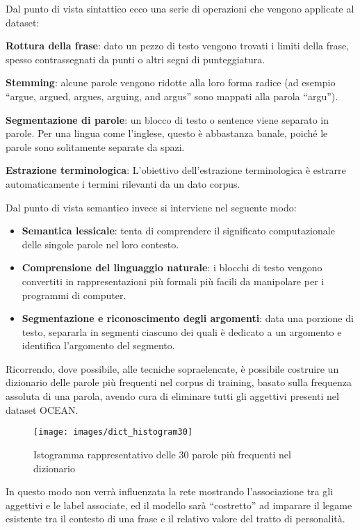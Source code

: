 Dal punto di vista sintattico ecco una serie di operazioni che vengono applicate al dataset:
\begin{itemize}
	\item \textbf{Rottura della frase}: dato un pezzo di testo vengono trovati i limiti della frase, spesso contrassegnati da punti o altri segni di punteggiatura.
	\item \textbf{Stemming}: alcune parole vengono ridotte alla loro forma radice (ad esempio ``argue, argued, argues, arguing, and argus'' sono mappati alla parola ``argu'').
	\item \textbf{Segmentazione di parole}: un blocco di testo o sentence viene separato in parole. Per una lingua come l'inglese, questo è abbastanza banale, poiché le parole sono solitamente separate da spazi. 
	{\color{orange}	\item \textbf{Estrazione terminologica}: L'obiettivo dell'estrazione terminologica è estrarre automaticamente i termini rilevanti da un dato corpus.}
\end{itemize}
Dal punto di vista semantico invece si interviene nel seguente modo:
\begin{itemize}
	\item \textbf{Semantica lessicale}: tenta di comprendere il significato computazionale delle singole parole nel loro contesto.
	\item \textbf{Comprensione del linguaggio naturale}: i blocchi di testo vengono convertiti in rappresentazioni più formali più facili da manipolare per i programmi di computer. 
	\item \textbf{Segmentazione e riconoscimento degli argomenti}: data una porzione di testo, separarla in segmenti ciascuno dei quali è dedicato a un argomento e identifica l'argomento del segmento.
\end{itemize}
Ricorrendo, dove possibile, alle tecniche sopraelencate, è possibile costruire un dizionario delle  parole più frequenti nel corpus di training, basato sulla frequenza assoluta di una parola, avendo cura di eliminare tutti gli aggettivi presenti nel dataset OCEAN.

\begin{figure}[H]
	\centering
	{\texttt{[image: images/dict\_histogram30]}}
	\caption{Istogramma rappresentativo delle \num{30} parole più frequenti nel dizionario}
	\label{fig:Istrogramma del dizionario}
\end{figure}
In questo modo non verrà influenzata la rete mostrando l'associazione tra gli aggettivi e le label associate, ed il modello sarà ``costretto'' ad imparare il legame esistente tra il contesto di una frase e il relativo valore del tratto di personalità. 


